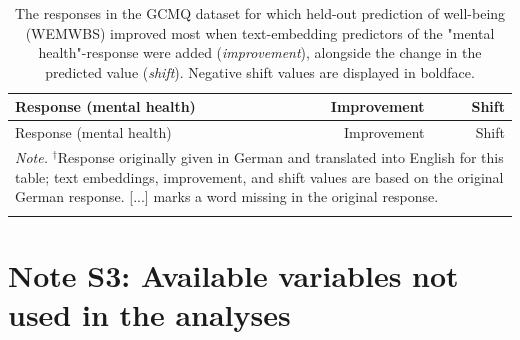 \documentclass[man,floatsintext]{apa7}
\newcommand{\change}[1]{#1}
\begin{document}
\begingroup\footnotesize
\begin{longtable}{p{12cm}rr}
\caption{The  responses in the GCMQ dataset for which \change{held-out} prediction of well-being (WEMWBS) improved most when text-embedding predictors of the "mental health"-response were added (\emph{improvement}), alongside the change in the predicted value (\emph{shift}). Negative shift values are displayed in boldface.}
\label{tab:examples_GCMQ}\\

\hline

Response (mental health) & Improvement & Shift \\
\hline
\endfirsthead

\hline
Response (mental health) & Improvement & Shift \\
\hline
\endhead

\multicolumn{3}{p{14cm}}{\textit{Note.} $^{\dagger}$Response originally given in German and translated into English for this table; text embeddings, improvement, and shift values are based on the original German response. [...] marks a word missing in the original response.} \\
\endlastfoot


\end{longtable}
\endgroup

\section{Note S3: Available variables not used in the analyses}
\end{document}
